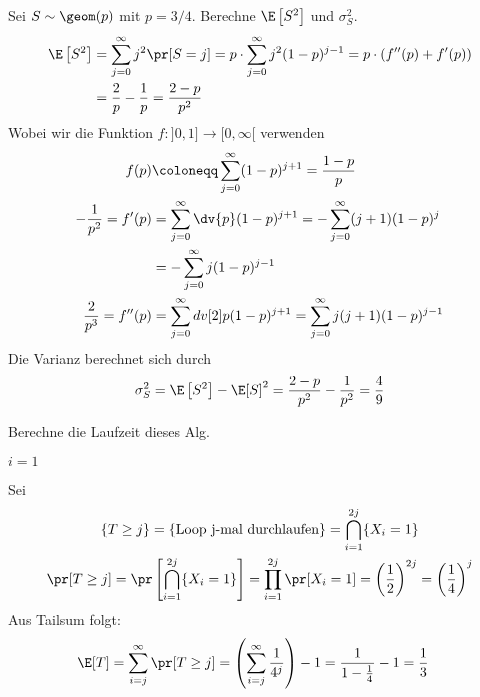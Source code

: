 \begin{example}
	Sei $S \sim \geom(p)$ mit $p=3/4$. Berechne $\E \left[ S^2 \right]$ und $\sigma_S^2$.
	\tcblower
	\begin{align*}
		\E \left[ S^2 \right] &= \sum_{j=0}^{\infty} j^2 \pr[S = j] = p \cdot \sum_{j=0}^{\infty} j^2 (1-p)^{j-1} = p
		\cdot (f'' (p) + f'(p))\\
									 &= \frac{2}{p} - \frac{1}{p} = \frac{2 - p}{p^2} 
	\end{align*}
	Wobei wir die Funktion $f : ]0,1] \rightarrow [0,\infty[$ verwenden
	\begin{align*}
		f(p) &\coloneqq \sum_{j=0}^{\infty} (1-p)^{j+1} = \frac{1-p}{p} \\
		- \frac{1}{p^2} = f'(p) &= \sum_{j=0}^{\infty} \dv{p} (1-p)^{j+1} = - \sum_{j=0}^{\infty} (j+1)(1-p)^j \\
										&= -\sum_{j=0}^{\infty} j(1-p)^{j-1}\\
		\frac{2}{p^3} = f''(p) &= \sum_{j=0}^{\infty} dv[2]{p} (1- p)^{j+1} = \sum_{j=0}^{\infty} j(j+1)(1-p)^{j-1}  
	\end{align*}
	Die Varianz berechnet sich durch
	\begin{equation*}
		\sigma_S^2 = \E \left[ S^2 \right] - \E[S]^2 = \frac{2-p}{p^2} - \frac{1}{p^2} = \frac{4}{9} 
	\end{equation*}
\end{example}
\begin{example}
	Berechne die Laufzeit dieses Alg.
	\begin{algorithm}[H]
		\DontPrintSemicolon
		$i = 1$\;
	\end{algorithm}
	\tcblower
	Sei
	\begin{gather*}
		\{T \geq j\} = \{\text{Loop j-mal durchlaufen}\} = \bigcap_{i=1}^{2j} \{X_i = 1\}\\
		\pr[T \geq j] = \pr \left[ \bigcap_{i=1}^{2j} \{X_i = 1\} \right] = \prod_{i=1}^{2j} \pr[X_i = 1] = \left(
		\frac{1}{2} \right)^{2j} = \left( \frac{1}{4} \right)^j
	\end{gather*}
	Aus Tailsum folgt:
	\begin{align*}
		\E[T] &= \sum_{i=j}^{\infty} \pr [T \geq j] = \left( \sum_{i=j}^{\infty} \frac{1}{4^j} \right) - 1 =
		\frac{1}{1-\frac{1}{4}} -1 = \frac{1}{3}
	\end{align*}
\end{example}
